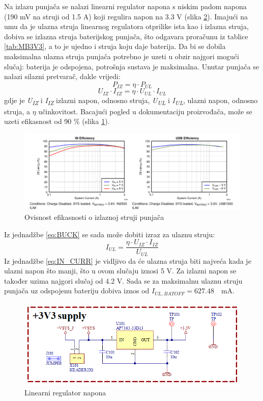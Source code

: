 Na izlazu punjača se nalazi linearni regulator napona s niskim padom napona (190 mV na struji od 1.5 A) koji regulira napon na 3.3 V (slika \ref{slk:MB_LDO}). Imajući na umu da je ulazna struja linearnog regulatora otprilike ista kao i izlazna struja, dobiva se izlazna struja baterijskog punjača, što odgavara proračunu iz tablice \ref{tab:MB3V3}, a to je ujedno i struja koju daje baterija. Da bi se dobila maksimalna ulazna struja punjača potrebno je uzeti u obzir najgori mogući slučaj: baterija je odspojena, potrošnja sustava je maksimalna. Unutar punjača se nalazi silazni pretvarač, dakle vrijedi:
\begin{equation}
    P_{IZ}=\eta \cdot P_{UL}
\end{equation}
\begin{equation} \label{eq:BUCK}
    U_{IZ}\cdot I_{IZ}=\eta \cdot U_{UL} \cdot I_{UL}
\end{equation}
gdje je \textit{U\textsubscript{IZ}} i \textit{I\textsubscript{IZ}} izlazni napon, odnosno struja, \textit{U\textsubscript{UL}} i \textit{I\textsubscript{UL}}, ulazni napon, odnosno struja, a $\eta$ učinkovitost. Bacajući pogled u dokumentaciju proizvođača, može se uzeti efikasnost od 90 \% (slika \ref{slk:EFFICIENCY}).
\begin{figure}[hbt]
    \centering
    \includegraphics[width=\textwidth]{Figures/EFFICIENCY.PNG}
    \caption{Ovisnost efikasnosti o izlaznoj struji punjača \cite{ti:bq24166}}
    \label{slk:EFFICIENCY}
\end{figure}
Iz jednadžbe \ref{eq:BUCK} se sada može dobiti izraz za ulaznu struju:
\begin{equation} \label{eq:IN_CURR}
    I_{UL}=\frac{\eta \cdot U_{IZ} \cdot I_{IZ}}{U_{UL}}
\end{equation}
Iz jednadžbe \ref{eq:IN_CURR} je vidljivo da će ulazna struja biti najveća kada je ulazni napon što manji, što u ovom slučaju iznosi 5 V. Za izlazni napon se također uzima najgori slučaj od 4.2 V. Sada se za maksimalnu ulaznu struju punjača uz odspojenu bateriju dobiva iznos od ${I_{UL,BATOFF} = 627.48\quad \textrm{mA}}$.
\begin{figure}[hbt]
    \centering
    \includegraphics[width = 10 cm]{Figures/MB_LDO.png}
    \caption{Linearni regulator napona}
    \label{slk:MB_LDO}
\end{figure}

